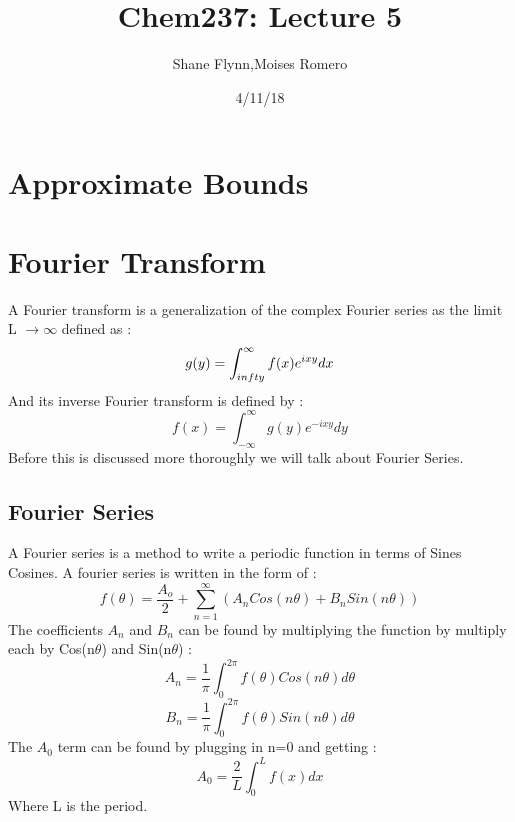 \documentclass{article}
\title{Chem237: Lecture 5}
\date{4/11/18}
\author{Shane Flynn,Moises Romero}
\newcommand{\be}{\begin{equation}}
\newcommand{\ee}{\end{equation}}
\begin{document}
\maketitle
\section*{Approximate Bounds}
\section*{Fourier Transform}
A Fourier transform is a generalization of the complex Fourier series as the limit L $\to \infty$ defined as :
\be
g(y) = \int_{\- infty}^\infty f(x) e^{ixy} dx
\ee
And its inverse Fourier transform is defined by :
\be
f(x) = \int_{-\infty}^{\infty} g(y) e^{-ixy} dy
\ee
Before this is discussed more thoroughly we will talk about Fourier Series.
\subsection*{Fourier Series}
A Fourier series is a method to write a periodic function in terms of Sines Cosines. A fourier series is written in the form of :
\be
f(\theta) = \frac{A_o}{2} + \sum_{n=1}^\infty (A_n Cos(n\theta) + B_n Sin(n \theta) )
\ee
The coefficients $A_n$ and $B_n$ can be found by multiplying the function by multiply each by Cos(n$\theta$) and Sin(n$\theta$) :
\be
A_n = \frac{1}{\pi} \int_0^{2\pi} f(\theta) Cos(n\theta) d\theta
\ee
\be
B_n = \frac{1}{\pi} \int_0^{2\pi} f(\theta) Sin(n\theta) d\theta
\ee
The $A_0$ term can be found by plugging in n=0 and getting :
\be
A_0 = \frac{2}{L} \int_0^L f(x) dx
\ee
Where L is the period.
\end{document}
